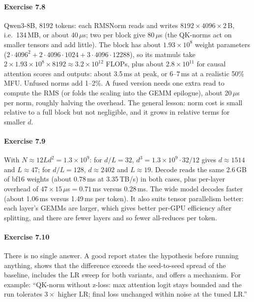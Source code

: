 \paragraph{Exercise 7.8} Qwen3-8B, 8192 tokens: each RMSNorm reads and writes $8192\times4096\times2$\,B, i.e.\
134\,MB, or about 40\,$\mu$s; two per block give 80\,$\mu$s (the QK-norms act on smaller tensors and add
little). The block has about $1.93\times10^8$ weight parameters
($2\cdot4096^2+2\cdot4096\cdot1024+3\cdot4096\cdot12288$), so its matmuls take
$2\times1.93\times10^8\times8192\approx3.2\times10^{12}$ FLOPs, plus about $2.8\times10^{11}$ for causal attention
scores and outputs: about 3.5\,ms at peak, or 6--7\,ms at a realistic 50\% MFU. Unfused norms add 1--2\%. A
fused version needs one extra read to compute the RMS (or folds the scaling into the GEMM epilogue),
about 20\,$\mu$s per norm, roughly halving the overhead. The general lesson: norm cost is small relative
to a full block but not negligible, and it grows in relative terms for smaller $d$.

\paragraph{Exercise 7.9} With $N\approx12Ld^2=1.3\times10^9$: for $d/L=32$, $d^3=1.3\times10^9\cdot32/12$ gives
$d\approx1514$ and $L\approx47$; for $d/L=128$, $d\approx2402$ and $L\approx19$. Decode reads the same 2.6\,GB of
bf16 weights (about 0.78\,ms at 3.35\,TB/s) in both cases, plus per-layer overhead of
$47\times15\,\mu$s$=0.71$\,ms versus $0.28$\,ms. The wide model decodes faster (about 1.06\,ms versus
1.49\,ms per token). It also suits tensor parallelism better: each layer's GEMMs are larger, which gives better
per-GPU efficiency after splitting, and there are fewer layers and so fewer all-reduces per token.

\paragraph{Exercise 7.10} There is no single answer. A good report states the hypothesis before running
anything, shows that the difference exceeds the seed-to-seed spread of the baseline, includes the LR sweep
for both variants, and offers a mechanism. For example: ``QK-norm without z-loss: max attention logit stays
bounded and the run tolerates $3\times$ higher LR; final loss unchanged within noise at the tuned LR.''
